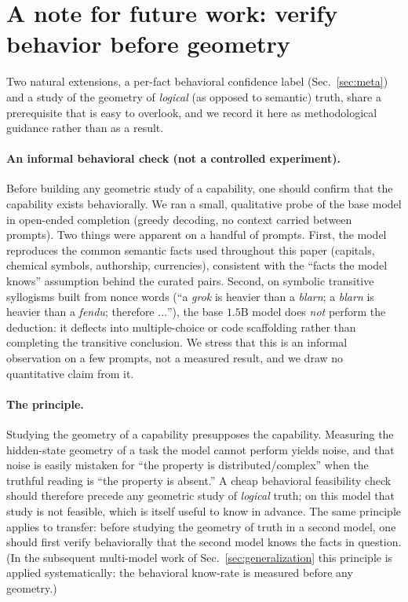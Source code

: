 \documentclass[11pt]{article}
\begin{document}
\section{A note for future work: verify behavior before geometry}
\label{sec:future}

Two natural extensions, a per-fact behavioral confidence label
(Sec.~\ref{sec:meta}) and a study of the geometry of \emph{logical} (as
opposed to semantic) truth, share a prerequisite that is easy to overlook,
and we record it here as methodological guidance rather than as a result.

\paragraph{An informal behavioral check (not a controlled experiment).}
Before building any geometric study of a capability, one should confirm that
the capability exists behaviorally. We ran a small, qualitative probe of the
base model in open-ended completion (greedy decoding, no context carried
between prompts). Two things were apparent on a handful of prompts. First,
the model reproduces the common semantic facts used throughout this paper
(capitals, chemical symbols, authorship, currencies), consistent with the
``facts the model knows'' assumption behind the curated pairs. Second, on
symbolic transitive syllogisms built from nonce words (``a \emph{grok} is
heavier than a \emph{blarn}; a \emph{blarn} is heavier than a \emph{fendu};
therefore $\ldots$''), the base $1.5$B model does \emph{not} perform the
deduction: it deflects into multiple-choice or code scaffolding rather than
completing the transitive conclusion. We stress that this is an informal
observation on a few prompts, not a measured result, and we draw no
quantitative claim from it.

\paragraph{The principle.} Studying the geometry of a capability presupposes
the capability. Measuring the hidden-state geometry of a task the model
cannot perform yields noise, and that noise is easily mistaken for ``the
property is distributed/complex'' when the truthful reading is ``the property
is absent.'' A cheap behavioral feasibility check should therefore precede
any geometric study of \emph{logical} truth; on this model that study is not
feasible, which is itself useful to know in advance. The same principle
applies to transfer: before studying the geometry of truth in a second model,
one should first verify behaviorally that the second model knows the facts in
question. (In the subsequent multi-model work of
Sec.~\ref{sec:generalization} this principle is applied systematically: the
behavioral know-rate is measured before any geometry.)
\end{document}
